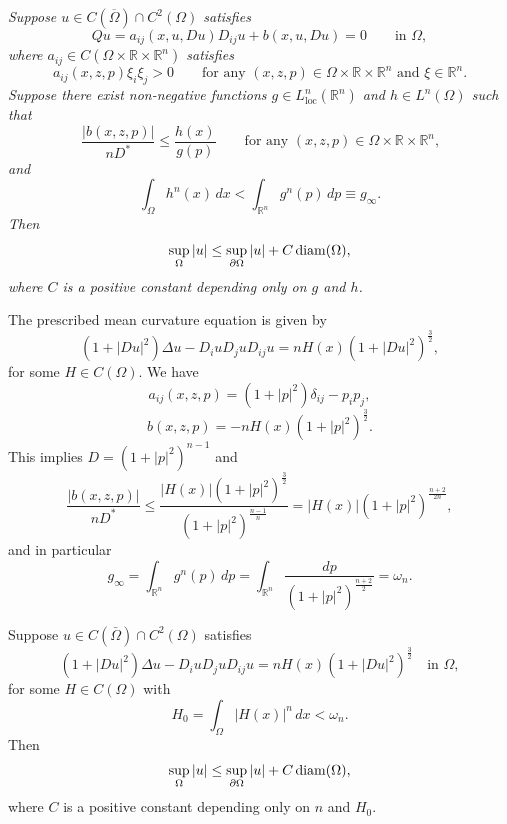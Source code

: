 \begin{theorem}\label{hanlin:maxprin-theorem-2-36}
\textit{Suppose $u \in C(\overline{\Omega}) \cap C^2(\Omega)$ satisfies}
\[
Qu = a_{ij}(x,u,Du)D_{ij}u + b(x,u,Du) = 0 \qquad \text{in } \Omega,
\]
\textit{where $a_{ij} \in C(\Omega \times \mathbb{R} \times \mathbb{R}^n)$ satisfies}
\[
a_{ij}(x,z,p)\xi_i\xi_j > 0 \qquad \text{for any $(x,z,p)\in \Omega \times \mathbb{R} \times \mathbb{R}^n$ and $\xi \in \mathbb{R}^n$.}
\]
\textit{Suppose there exist non-negative functions $g \in L^n_{\mathrm{loc}}(\mathbb{R}^n)$ and $h \in L^n(\Omega)$ such that}
\[
\frac{|b(x,z,p)|}{nD^*} \leq \frac{h(x)}{g(p)} \qquad \text{for any $(x,z,p)\in \Omega \times \mathbb{R} \times \mathbb{R}^n$,}
\]
\textit{and}
\[
\int_\Omega h^n(x)\,dx < \int_{\mathbb{R}^n} g^n(p)\,dp \equiv g_\infty.
\]
\textit{Then}
\[
\sup_{\Omega} |u| \le \sup_{\partial \Omega} |u| + C \operatorname{diam}(\Omega),
\]
\textit{where $C$ is a positive constant depending only on $g$ and $h$.}
\end{theorem}


\begin{example}\label{hanlin:maxprin-example-2-37}
The prescribed mean curvature equation is given by
\[
(1 + |Du|^2)\Delta u - D_i u D_j u D_{ij}u = nH(x)(1 + |Du|^2)^{\frac{3}{2}},
\]
for some $H \in C(\Omega)$. We have
\[
a_{ij}(x,z,p) = (1 + |p|^2)\delta_{ij} - p_i p_j,
\]
\[
b(x,z,p) = -nH(x)(1 + |p|^2)^{\frac{3}{2}}.
\]
This implies $D = (1 + |p|^2)^{n-1}$ and
\[
\frac{|b(x,z,p)|}{nD^*} \le \frac{|H(x)|(1 + |p|^2)^{\frac{3}{2}}}{(1 + |p|^2)^{\frac{n-1}{n}}}
= |H(x)|(1 + |p|^2)^{\frac{n+2}{2n}},
\]
and in particular
\[
g_{\infty} = \int_{\mathbb{R}^n} g^n(p)\,dp
= \int_{\mathbb{R}^n} \frac{dp}{(1 + |p|^2)^{\frac{n+2}{2}}}
= \omega_n.
\]
\end{example}

\begin{corollary}\label{hanlin:maxprin-cor-2-38}
Suppose $u \in C(\bar{\Omega}) \cap C^2(\Omega)$ satisfies
\[
(1 + |Du|^2)\Delta u - D_i u D_j u D_{ij}u = nH(x)(1 + |Du|^2)^{\frac{3}{2}}
\quad \text{in } \Omega,
\]
for some $H \in C(\Omega)$ with
\[
H_0 = \int_{\Omega} |H(x)|^n\,dx < \omega_n.
\]
Then
\[
\sup_{\Omega} |u| \le \sup_{\partial \Omega} |u| + C \operatorname{diam}(\Omega),
\]
where $C$ is a positive constant depending only on $n$ and $H_0$.
\end{corollary}

